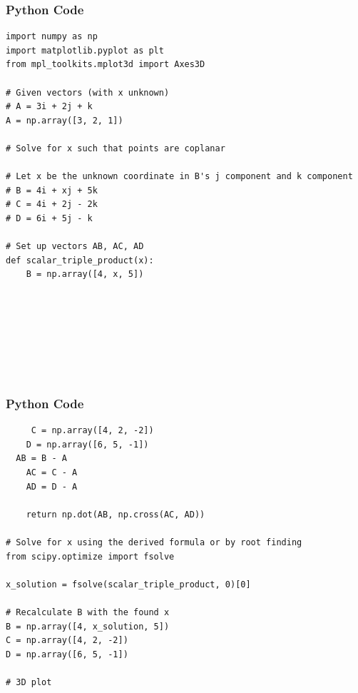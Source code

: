 \documentclass{beamer}
\begin{document}
\begin{frame}[fragile]
    \frametitle{Python Code}
    \begin{lstlisting}
import numpy as np
import matplotlib.pyplot as plt
from mpl_toolkits.mplot3d import Axes3D

# Given vectors (with x unknown)
# A = 3i + 2j + k
A = np.array([3, 2, 1])

# Solve for x such that points are coplanar

# Let x be the unknown coordinate in B's j component and k component
# B = 4i + xj + 5k
# C = 4i + 2j - 2k
# D = 6i + 5j - k

# Set up vectors AB, AC, AD
def scalar_triple_product(x):
    B = np.array([4, x, 5])
   

  





    \end{lstlisting}
\end{frame}

\begin{frame}[fragile]
    \frametitle{Python Code}
    \begin{lstlisting}
     C = np.array([4, 2, -2])
    D = np.array([6, 5, -1])
  AB = B - A
    AC = C - A
    AD = D - A

    return np.dot(AB, np.cross(AC, AD))

# Solve for x using the derived formula or by root finding
from scipy.optimize import fsolve

x_solution = fsolve(scalar_triple_product, 0)[0]

# Recalculate B with the found x
B = np.array([4, x_solution, 5])
C = np.array([4, 2, -2])
D = np.array([6, 5, -1])

# 3D plot


    \end{lstlisting}
\end{frame}
\end{document}
